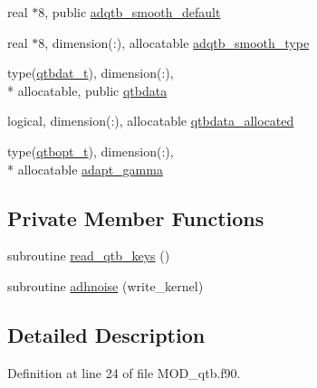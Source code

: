 \begin{DoxyCompactItemize}
\item 
real $\ast$8, public \hyperlink{classqtb_a777a3ecfccb537a2e3b6bb5c43a49d70}{adqtb\-\_\-smooth\-\_\-default}
\item 
real $\ast$8, dimension(\-:), allocatable \hyperlink{classqtb_a0f377d6b63265e4e7d79114e82047458}{adqtb\-\_\-smooth\-\_\-type}
\item 
type(\hyperlink{structqtb_1_1qtbdat__t}{qtbdat\-\_\-t}), dimension(\-:), \\*
allocatable, public \hyperlink{classqtb_a29928faed9e005ea9609cd4c55f4ada8}{qtbdata}
\item 
logical, dimension(\-:), allocatable \hyperlink{classqtb_a6e5a1730bb8b5493f5205922093a3fdc}{qtbdata\-\_\-allocated}
\item 
type(\hyperlink{structqtb_1_1qtbopt__t}{qtbopt\-\_\-t}), dimension(\-:), \\*
allocatable \hyperlink{classqtb_a175b26fb3570a3faedd3c49a5d8bd3e6}{adapt\-\_\-gamma}
\end{DoxyCompactItemize}
\subsection*{Private Member Functions}
\begin{DoxyCompactItemize}
\item 
subroutine \hyperlink{classqtb_ae50e4340ff156901b63157ff686b0438}{read\-\_\-qtb\-\_\-keys} ()
\item 
subroutine \hyperlink{classqtb_a79eca7ca16cc3a49f3f3303415a1ee73}{adhnoise} (write\-\_\-kernel)
\end{DoxyCompactItemize}


\subsection{Detailed Description}


Definition at line 24 of file M\-O\-D\-\_\-qtb.\-f90.



